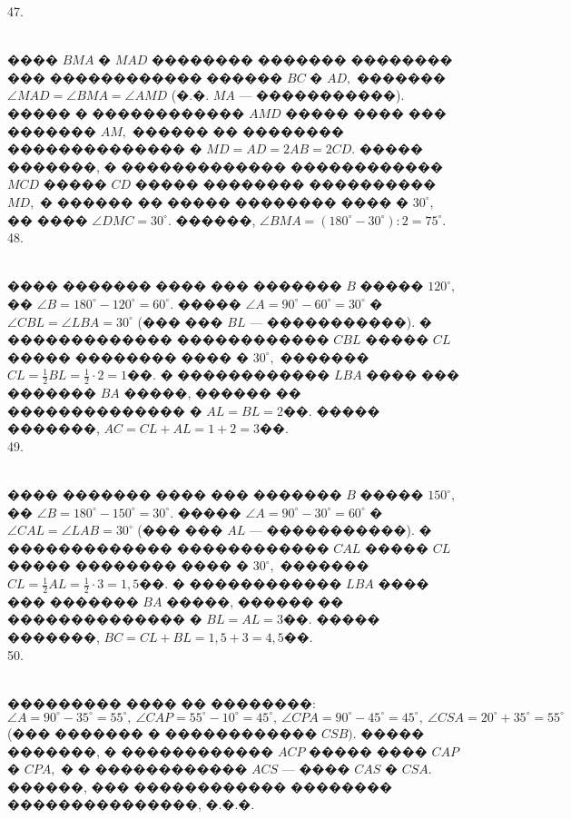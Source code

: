 \documentclass[12pt]{article}
\begin{document}
47. \begin{figure}[ht!]
\end{figure}\\
���� $BMA$ � $MAD$ �������� ������� �������� ��� ������������ ������ $BC$ � $AD,$ ������� $\angle MAD=\angle BMA=\angle AMD$ (�.�. $MA$ --- �����������). ����� � ������������ $AMD$ ����� ���� ��� ������� $AM,$ ������ �� �������� �������������� � $MD=AD=2AB=2CD.$ ����� �������, � ������������� ������������ $MCD$ ����� $CD$ ����� �������� ���������� $MD,$ � ������ �� ����� �������� ���� � $30^\circ,$ �� ���� $\angle DMC=30^\circ.$ ������, $\angle BMA=(180^\circ-30^\circ):2=75^\circ.$\\
48. \begin{figure}[ht!]
\end{figure}\\
���� ������� ���� ��� ������� $B$ ����� $120^\circ,$ �� $\angle B=180^\circ-120^\circ=60^\circ.$ ����� $\angle A=90^\circ-60^\circ=30^\circ$ � $\angle CBL=\angle LBA=30^\circ$ (��� ��� $BL$ --- �����������). � ������������� ������������ $CBL$ ����� $CL$ ����� �������� ���� � $30^\circ,$ ������� $CL=\frac{1}{2}BL=\frac{1}{2}\cdot2=1$��. � ������������ $LBA$ ���� ��� ������� $BA$ �����, ������ �� �������������� � $AL=BL=2$��. ����� �������, $AC=CL+AL=1+2=3$��.\\
49. \begin{figure}[ht!]
\end{figure}\\
���� ������� ���� ��� ������� $B$ ����� $150^\circ,$ �� $\angle B=180^\circ-150^\circ=30^\circ.$ ����� $\angle A=90^\circ-30^\circ=60^\circ$ � $\angle CAL=\angle LAB=30^\circ$ (��� ��� $AL$ --- �����������). � ������������� ������������ $CAL$ ����� $CL$ ����� �������� ���� � $30^\circ,$ ������� $CL=\frac{1}{2}AL=\frac{1}{2}\cdot3=1,5$��. � ������������ $LBA$ ���� ��� ������� $BA$ �����, ������ �� �������������� � $BL=AL=3$��. ����� �������, $BC=CL+BL=1,5+3=4,5$��.\\
50. \begin{figure}[ht!]
\end{figure}\\
��������� ���� �� ��������: $\angle A=90^\circ-35^\circ=55^\circ,\ \angle CAP=55^\circ-10^\circ=45^\circ,\ \angle CPA=90^\circ-45^\circ=45^\circ,\ \angle CSA=20^\circ+35^\circ=55^\circ$ (��� ������� � ������������ $CSB).$ ����� �������, � ������������ $ACP$ ����� ���� $CAP$ � $CPA,$ � � ������������ $ACS$ --- ���� $CAS$ � $CSA.$ ������, ��� ������������ �������� ���������������, �.�.�.\\
\end{document}
